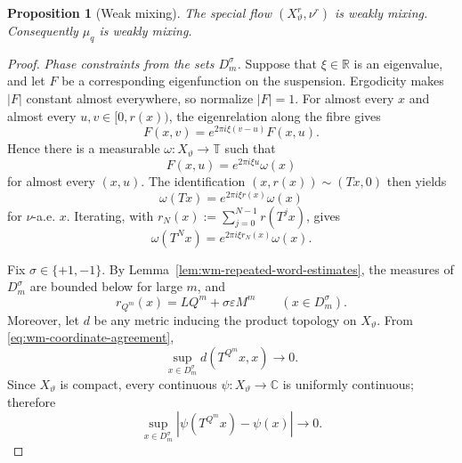 \documentclass[11pt,reqno,a4paper]{amsart}
\numberwithin{equation}{section}
\theoremstyle{compact}
\newtheorem{proposition}[proposition]{Proposition}
\theoremstyle{definition}
\theoremstyle{definition}
\begin{document}
\begin{proposition}[Weak mixing]
\label{prop:wm-weak-mixing}
The special flow $(X_\vartheta^r,\nu^r)$ is weakly mixing.  Consequently
$\mu_q$ is weakly mixing.
\end{proposition}

\begin{proof}
\smallskip\noindent\emph{Phase constraints from the sets $D_m^\sigma$.}
Suppose that $\xi\in\mathbb R$ is an eigenvalue, and let $F$ be a
corresponding eigenfunction on the suspension.  Ergodicity makes $|F|$
constant almost everywhere, so normalize $|F|=1$.  For almost every $x$ and
almost every $u,v\in[0,r(x))$, the eigenrelation along the fibre gives
\[
  F(x,v)=e^{2\pi i\xi(v-u)}F(x,u).
\]
Hence there is a measurable $\omega:X_\vartheta\to\mathbb T$ such that
\[
  F(x,u)=e^{2\pi i\xi u}\omega(x)
\]
for almost every $(x,u)$.  The identification
$(x,r(x))\sim(Tx,0)$ then yields
\begin{equation}\label{eq:wm-eigenvalue-cohomology}
  \omega(Tx)=e^{2\pi i\xi r(x)}\omega(x)
\end{equation}
for $\nu$-a.e. $x$.  Iterating, with
$r_N(x):=\sum_{j=0}^{N-1}r(T^jx)$, gives
\begin{equation}\label{eq:wm-eigenvalue-iterate}
  \omega(T^Nx)=e^{2\pi i\xi r_N(x)}\omega(x).
\end{equation}

Fix $\sigma\in\{+1,-1\}$.  By
Lemma~\ref{lem:wm-repeated-word-estimates}, the measures of
$D_m^\sigma$ are bounded below for large $m$, and
\begin{equation}\label{eq:wm-eigenvalue-return-time}
  r_{Q^m}(x)=LQ^m+\sigma\varepsilon M^m
  \qquad(x\in D_m^\sigma).
\end{equation}
Moreover, let $d$ be any metric inducing the product topology on
$X_\vartheta$.  From \eqref{eq:wm-coordinate-agreement},
\[
  \sup_{x\in D_m^\sigma}d(T^{Q^m}x,x)\longrightarrow0.
\]
Since $X_\vartheta$ is compact, every continuous
$\psi:X_\vartheta\to\mathbb C$ is uniformly continuous; therefore
\begin{equation}\label{eq:wm-continuous-approximation}
  \sup_{x\in D_m^\sigma}
  |\psi(T^{Q^m}x)-\psi(x)|\longrightarrow0.
\end{equation}


\end{proof}
\end{document}
